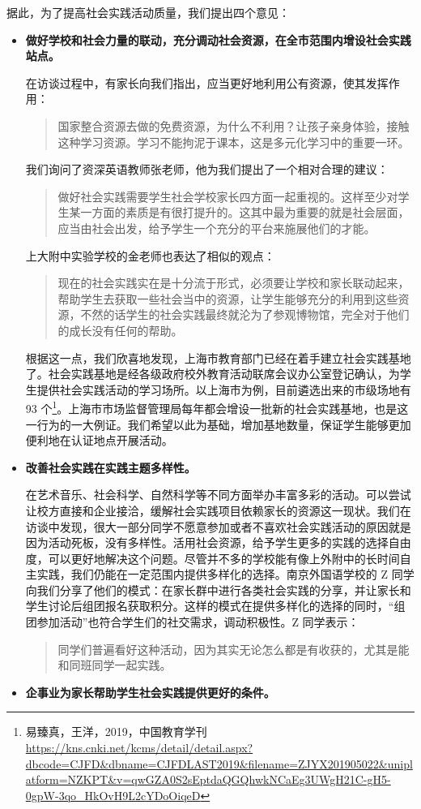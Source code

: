 \documentclass[12pt,UTF8]{ctexart}
\begin{document}
\par {
	据此，为了提高社会实践活动质量，我们提出四个意见：
	\begin {itemize}
	\item [1)] \textbf{做好学校和社会力量的联动，充分调动社会资源，在全市范围内增设社会实践站点。}
	\par {
		在访谈过程中，有家长向我们指出，应当更好地利用公有资源，使其发挥作用：
		\begin{quote}
			\kaishu 国家整合资源去做的免费资源，为什么不利用？让孩子亲身体验，接触这种学习资源。学习不能拘泥于课本，这是多元化学习中的重要一环。
		\end{quote}
		我们询问了资深英语教师张老师，他为我们提出了一个相对合理的建议：
		\begin{quote}
			\kaishu
			做好社会实践需要学生社会学校家长四方面一起重视的。这样至少对学生某一方面的素质是有很打提升的。这其中最为重要的就是社会层面，应当由社会出发，给予学生一个充分的平台来施展他们的才能。
		\end{quote}
		上大附中实验学校的金老师也表达了相似的观点：
		\begin{quote}
			\kaishu
			现在的社会实践实在是十分流于形式，必须要让学校和家长联动起来，帮助学生去获取一些社会当中的资源，让学生能够充分的利用到这些资源，不然的话学生的社会实践最终就沦为了参观博物馆，完全对于他们的成长没有任何的帮助。
		\end{quote}
		
		根据这一点，我们欣喜地发现，上海市教育部门已经在着手建立社会实践基地了。社会实践基地是经各级政府校外教育活动联席会议办公室登记确认，为学生提供社会实践活动的学习场所。以上海市为例，目前遴选出来的市级场地有
		93 个\footnote{易臻真，王洋，2019，中国教育学刊
			\url{https://kns.cnki.net/kcms/detail/detail.aspx?dbcode=CJFD&dbname=CJFDLAST2019&filename=ZJYX201905022&uniplatform=NZKPT&v=qwGZA0S2sEptdaQGQhwkNCaEg3UWgH21C-gH5-0gpW-3qo_HkOvH9L2cYDoOiqeD}}。上海市市场监督管理局每年都会增设一批新的社会实践基地，也是这一行为的一大例证。我们希望以此为基础，增加基地数量，保证学生能够更加便利地在认证地点开展活动。
	}
	\item [2)] \textbf{改善社会实践在实践主题多样性。}
	\par {
		
		在艺术音乐、社会科学、自然科学等不同方面举办丰富多彩的活动。可以尝试让校方直接和企业接洽，缓解社会实践项目依赖家长的资源这一现状。我们在访谈中发现，很大一部分同学不愿意参加或者不喜欢社会实践活动的原因就是因为活动死板，没有多样性。活用社会资源，给予学生更多的实践的选择自由度，可以更好地解决这个问题。尽管并不多的学校能有像上外附中的长时间自主实践，我们仍能在一定范围内提供多样化的选择。南京外国语学校的
		Z
		同学向我们分享了他们的模式：在家长群中进行各类社会实践的分享，并让家长和学生讨论后组团报名获取积分。这样的模式在提供多样化的选择的同时，“组团参加活动”也符合学生们的社交需求，调动积极性。Z
		同学表示：
		\begin{quote}
			\kaishu 同学们普遍看好这种活动，因为其实无论怎么都是有收获的，尤其是能和同班同学一起实践。
		\end{quote}
	}
	\item [3)] \textbf{企事业为家长帮助学生社会实践提供更好的条件。} 
	\par {
		
}
\end{itemize}}
\end{document}
